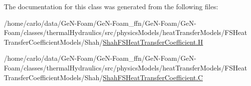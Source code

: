 The documentation for this class was generated from the following files\+:\begin{DoxyCompactItemize}
\item 
/home/carlo/data/\+Ge\+N-\/\+Foam/\+Ge\+N-\/\+Foam\+\_\+ffn/\+Ge\+N-\/\+Foam/\+Ge\+N-\/\+Foam/classes/thermal\+Hydraulics/src/physics\+Models/heat\+Transfer\+Models/\+F\+S\+Heat\+Transfer\+Coefficient\+Models/\+Shah/\hyperlink{ShahFSHeatTransferCoefficient_8H}{Shah\+F\+S\+Heat\+Transfer\+Coefficient.\+H}\item 
/home/carlo/data/\+Ge\+N-\/\+Foam/\+Ge\+N-\/\+Foam\+\_\+ffn/\+Ge\+N-\/\+Foam/\+Ge\+N-\/\+Foam/classes/thermal\+Hydraulics/src/physics\+Models/heat\+Transfer\+Models/\+F\+S\+Heat\+Transfer\+Coefficient\+Models/\+Shah/\hyperlink{ShahFSHeatTransferCoefficient_8C}{Shah\+F\+S\+Heat\+Transfer\+Coefficient.\+C}\end{DoxyCompactItemize}
